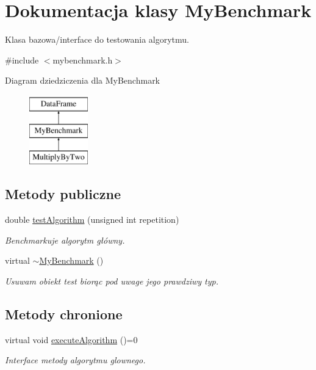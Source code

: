 \hypertarget{class_my_benchmark}{\section{Dokumentacja klasy My\-Benchmark}
\label{class_my_benchmark}
}


Klasa bazowa/interface do testowania algorytmu.  




{\ttfamily \#include $<$mybenchmark.\-h$>$}

Diagram dziedziczenia dla My\-Benchmark\begin{figure}[H]
\begin{center}
\leavevmode
\includegraphics[height=3.000000cm]{class_my_benchmark}
\end{center}
\end{figure}
\subsection*{Metody publiczne}
\begin{DoxyCompactItemize}
\item 
double \hyperlink{class_my_benchmark_a66576625ca37f8bc539c18ffceb69c9c}{test\-Algorithm} (unsigned int repetition)
\begin{DoxyCompactList}\small\item\em Benchmarkuje algorytm główny. \end{DoxyCompactList}\item 
virtual \hyperlink{class_my_benchmark_a00de82c40680b41065eb402ac90f1736}{$\sim$\-My\-Benchmark} ()
\begin{DoxyCompactList}\small\item\em Usuwam obiekt test biorąc pod uwage jego prawdziwy typ. \end{DoxyCompactList}\end{DoxyCompactItemize}
\subsection*{Metody chronione}
\begin{DoxyCompactItemize}
\item 
virtual void \hyperlink{class_my_benchmark_aaebbb9785ed7c460e33459464655a611}{execute\-Algorithm} ()=0
\begin{DoxyCompactList}\small\item\em Interface metody algorytmu glownego. \end{DoxyCompactList}\end{DoxyCompactItemize}
